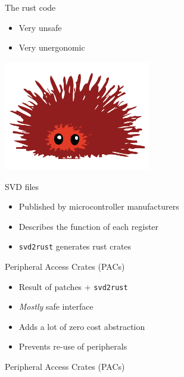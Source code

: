 \documentclass[aspectratio=169]{beamer}
\begin{document}
\begin{frame}{The rust code}
    \begin{itemize}
        \item Very unsafe
        \item Very unergonomic
    \end{itemize}
    \hspace*{5cm}\includegraphics[width=0.48\textwidth]{fig/unsafe.png}
\end{frame}

\begin{frame}{SVD files}
    \begin{itemize}
        \item{Published by microcontroller manufacturers}
        \item{Describes the function of each register}
        \item{\texttt{svd2rust} generates rust crates}
    \end{itemize}
\end{frame}

\begin{frame}{Peripheral Access Crates (PACs)}
    \begin{itemize}
        \item{Result of patches + \texttt{svd2rust}}
        \item{\textit{Mostly} safe interface}
        \item{Adds a lot of zero cost abstraction}
        \item{Prevents re-use of peripherals}
    \end{itemize}
\end{frame}

\begin{frame}{Peripheral Access Crates (PACs)}
    \begin{linehighlight}{
    }
        
    \end{linehighlight}
\end{frame}
\end{document}
